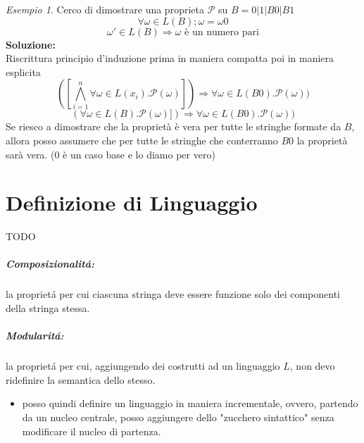 \documentclass[a4paper]{report}
\newcommand{\prop}{\mathcal{P}}
\theoremstyle{definition} \newtheorem*{defi}{Def}
\theoremstyle{plain} \newtheorem{lemma}{Lemma}
\theoremstyle{plain} \newtheorem{teo}{Teorema}
\theoremstyle{remark} \newtheorem*{es}{Esempio}
\begin{document}
\begin{es}
  Cerco di dimostrare una proprieta $\prop$ su $B=0|1|B0|B1$ \\
  \[
    \forall \omega \in L(B);\omega=\omega0
  \]
  \[
    \omega' \in L(B) \Rightarrow \text{$\omega$ è un numero pari}
  \]
  \textbf{Soluzione:} \\
  Riscrittura principio d'induzione prima in maniera compatta poi in maniera esplicita
   \[
    ([\bigwedge_{i=1}^{n} \forall \omega \in L(x_i).\prop(\omega)])
    \Rightarrow \forall \omega \in L(B0).\prop(\omega))
  \]
  \[
    (\forall \omega \in L(B).\prop(\omega)])
    \Rightarrow \forall \omega \in L(B0).\prop(\omega))
  \]
  Se riesco a dimostrare che la proprietà è vera per tutte le stringhe formate da $B$, allora posso assumere che per tutte le stringhe che conterranno $B0$ la proprietà sarà vera. ($0$ è un caso base e lo diamo per vero)

\end{es}

\chapter{Definizione di Linguaggio}
TODO
\paragraph{Composizionalit\'a:}
la propriet\'a per cui ciascuna stringa deve essere funzione solo dei componenti della stringa stessa.
\paragraph{Modularit\'a:}
la propriet\'a per cui, aggiungendo dei costrutti ad un linguaggio $L$, non devo ridefinire la semantica dello stesso.
\begin{itemize}
	\item posso quindi definire un linguaggio in maniera incrementale, ovvero, partendo da un nucleo centrale, posso aggiungere dello "zucchero sintattico" senza modificare il nucleo di partenza.
\end{itemize}
\end{document}
